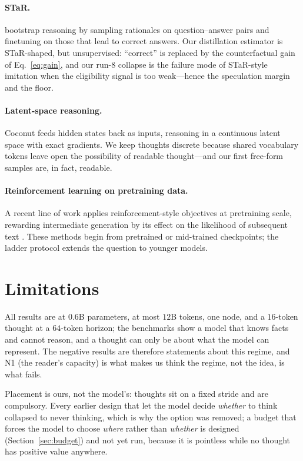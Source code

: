 \documentclass{article} %
\begin{document}
\paragraph{STaR.} \citet{zelikman2022star} bootstrap reasoning by sampling rationales on question--answer pairs and finetuning on those that lead to correct answers. Our distillation estimator is STaR-shaped, but unsupervised: ``correct'' is replaced by the counterfactual gain of Eq.~\eqref{eq:gain}, and our run-8 collapse is the failure mode of STaR-style imitation when the eligibility signal is too weak---hence the speculation margin and the floor.

\paragraph{Latent-space reasoning.} Coconut \citep{hao2024coconut} feeds hidden states back as inputs, reasoning in a continuous latent space with exact gradients. We keep thoughts discrete because shared vocabulary tokens leave open the possibility of readable thought---and our first free-form samples are, in fact, readable.

\paragraph{Reinforcement learning on pretraining data.} A recent line of work applies reinforcement-style objectives at pretraining scale, rewarding intermediate generation by its effect on the likelihood of subsequent text \citep{nvidia2025rlp}. These methods begin from pretrained or mid-trained checkpoints; the ladder protocol extends the question to younger models.

\section{Limitations}

All results are at 0.6B parameters, at most $12$B tokens, one node, and a $16$-token thought at a $64$-token horizon; the benchmarks show a model that knows facts and cannot reason, and a thought can only be about what the model can represent. The negative results are therefore statements about this regime, and N1 (the reader's capacity) is what makes us think the regime, not the idea, is what fails.

Placement is ours, not the model's: thoughts sit on a fixed stride and are compulsory. Every earlier design that let the model decide \emph{whether} to think collapsed to never thinking, which is why the option was removed; a budget that forces the model to choose \emph{where} rather than \emph{whether} is designed (Section~\ref{sec:budget}) and not yet run, because it is pointless while no thought has positive value anywhere.
\end{document}
